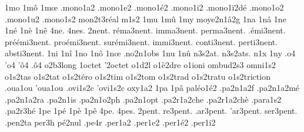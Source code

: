 {1mo
1mô
1mœ
                    .mono1a2
                    .mono1e2
                    .mono1é2
                    .mono1i2
                    .mono1ï2dé
                    .mono1o2
                    .mono1u2
                    .mono1s2
                    mon2t3réal %
m1s2
1mu
1mû
1my
                    moye2n1â2g
1na
1nâ
1ne
1né
1nè
1nê
4ne.
4nes.
      2nent. %
  réma3nent.
  imma3nent.
 perma3nent.
  .émi3nent.
préémi3nent.
proémi3nent.
surémi3nent.
  immi3nent.
 conti3nent.
 perti3nent.
 absti3nent.
%
1ni
1nî
1no
1nô
1nœ
                    .no2n1obs
1nu
1nû
                    n3s2at.
                    n3s2ats.
n1x
1ny
.o4
'o4
'ô4
.ô4
                    o2b3long
                    1octet %
                    '2octet
                    o1d2l
                    o1è2dre
                    o1ioni
                    ombud2s3
                    omni1s2
                    o1s2tas
                    o1s2tat
                    o1s2téro
                    o1s2tim
                    o1s2tom
                    o1s2trad
                    o1s2tratu
                    o1s2triction
                    .oua1ou
                    'oua1ou
                    .ovi1s2c
                    'ovi1s2c
                    oxy1a2
1pa
1pâ
                    paléo1é2
                    .pa2n1a2f
                    .pa2n1a2mé
                    .pa2n1a2ra
                    .pa2n1is
                    .pa2n1o2ph
                    .pa2n1opt
                    .pa2r1a2che
                    .pa2r1a2chè
                    .para1s2
                    .pa2r3hé
1pe
1pé
1pè
1pê
4pe.
4pes.
   2pent.
 re3pent.
.ar3pent.
'ar3pent.
ser3pent.
%
                    .pen2ta %
                    per3h
                    pé2nul %
                    .pe4r
                    .per1a2
                    .per1e2
                    .per1é2
                    .per1i2
}
